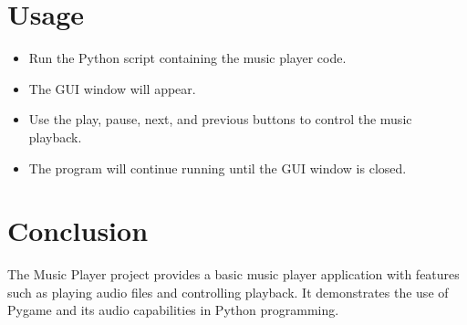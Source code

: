 \documentclass[journal,12pt,twocolumn]{IEEEtran}
\begin{document}
\section{Usage}
\begin{itemize}
\item Run the Python script containing the music player code.
\item The GUI window will appear.
\item Use the play, pause, next, and previous buttons to control the music playback.
\item The program will continue running until the GUI window is closed.
\end{itemize}

\section{Conclusion}
The Music Player project provides a basic music player application with features such as playing audio files and controlling playback. It demonstrates the use of Pygame and its audio capabilities in Python programming.
\end{document}
